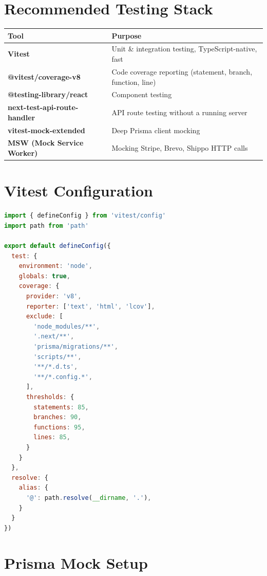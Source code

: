 \documentclass[12pt,a4paper]{report}
\begin{document}
\section{Recommended Testing Stack}

\begin{center}
\begin{tabular}{lp{9cm}}
  \toprule
  \textbf{Tool} & \textbf{Purpose} \\
  \midrule
  \textbf{Vitest}                    & Unit \& integration testing, TypeScript-native, fast \\
  \textbf{@vitest/coverage-v8}       & Code coverage reporting (statement, branch, function, line) \\
  \textbf{@testing-library/react}    & Component testing \\
  \textbf{next-test-api-route-handler} & API route testing without a running server \\
  \textbf{vitest-mock-extended}      & Deep Prisma client mocking \\
  \textbf{MSW (Mock Service Worker)} & Mocking Stripe, Brevo, Shippo HTTP calls \\
  \bottomrule
\end{tabular}
\end{center}

\section{Vitest Configuration}

\begin{lstlisting}[language=JavaScript, caption={vitest.config.ts}]
import { defineConfig } from 'vitest/config'
import path from 'path'

export default defineConfig({
  test: {
    environment: 'node',
    globals: true,
    coverage: {
      provider: 'v8',
      reporter: ['text', 'html', 'lcov'],
      exclude: [
        'node_modules/**',
        '.next/**',
        'prisma/migrations/**',
        'scripts/**',
        '**/*.d.ts',
        '**/*.config.*',
      ],
      thresholds: {
        statements: 85,
        branches: 90,
        functions: 95,
        lines: 85,
      }
    }
  },
  resolve: {
    alias: {
      '@': path.resolve(__dirname, '.'),
    }
  }
})
\end{lstlisting}

\section{Prisma Mock Setup}
\end{document}

